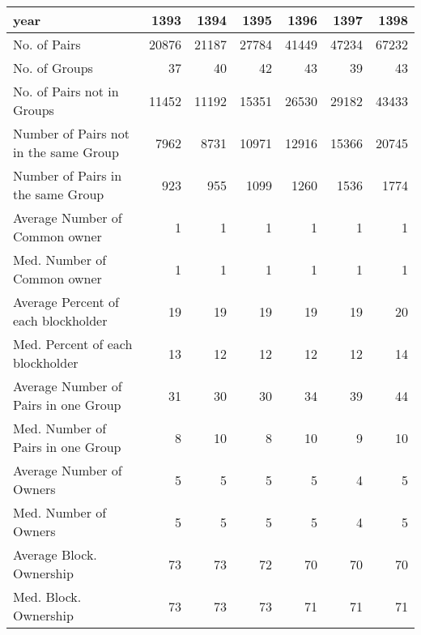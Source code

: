 \begin{tabular}{lrrrrrr}
\toprule
year &   1393 &   1394 &   1395 &   1396 &   1397 &   1398 \\
\midrule
No. of Pairs                          &  20876 &  21187 &  27784 &  41449 &  47234 &  67232 \\
No. of Groups                         &     37 &     40 &     42 &     43 &     39 &     43 \\
No. of Pairs not in Groups            &  11452 &  11192 &  15351 &  26530 &  29182 &  43433 \\
Number of Pairs not in the same Group &   7962 &   8731 &  10971 &  12916 &  15366 &  20745 \\
Number of Pairs in the same Group     &    923 &    955 &   1099 &   1260 &   1536 &   1774 \\
Average Number of Common owner        &      1 &      1 &      1 &      1 &      1 &      1 \\
Med. Number of Common owner           &      1 &      1 &      1 &      1 &      1 &      1 \\
Average Percent of each blockholder   &     19 &     19 &     19 &     19 &     19 &     20 \\
Med. Percent of each blockholder      &     13 &     12 &     12 &     12 &     12 &     14 \\
Average Number of Pairs in one Group  &     31 &     30 &     30 &     34 &     39 &     44 \\
Med. Number of Pairs in one Group     &      8 &     10 &      8 &     10 &      9 &     10 \\
Average Number of Owners              &      5 &      5 &      5 &      5 &      4 &      5 \\
Med. Number of Owners                 &      5 &      5 &      5 &      5 &      4 &      5 \\
Average Block. Ownership              &     73 &     73 &     72 &     70 &     70 &     70 \\
Med. Block. Ownership                 &     73 &     73 &     73 &     71 &     71 &     71 \\
\bottomrule
\end{tabular}
